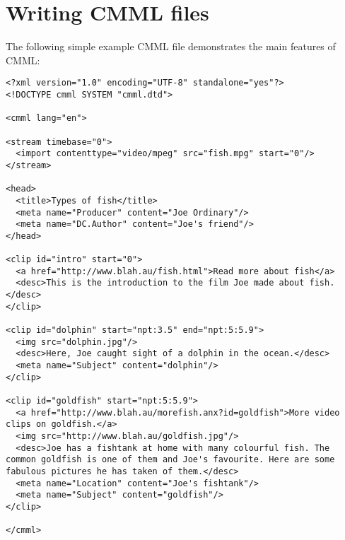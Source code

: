 \section{Writing CMML files}
\label{group__intro}
The following simple example CMML file demonstrates the main features of CMML:



\footnotesize\begin{verbatim}<?xml version="1.0" encoding="UTF-8" standalone="yes"?>
<!DOCTYPE cmml SYSTEM "cmml.dtd">

<cmml lang="en">

<stream timebase="0">
  <import contenttype="video/mpeg" src="fish.mpg" start="0"/>
</stream>

<head>
  <title>Types of fish</title>
  <meta name="Producer" content="Joe Ordinary"/>
  <meta name="DC.Author" content="Joe's friend"/>
</head>

<clip id="intro" start="0">
  <a href="http://www.blah.au/fish.html">Read more about fish</a>
  <desc>This is the introduction to the film Joe made about fish.</desc>
</clip>

<clip id="dolphin" start="npt:3.5" end="npt:5:5.9">
  <img src="dolphin.jpg"/>
  <desc>Here, Joe caught sight of a dolphin in the ocean.</desc>
  <meta name="Subject" content="dolphin"/>
</clip>

<clip id="goldfish" start="npt:5:5.9">
  <a href="http://www.blah.au/morefish.anx?id=goldfish">More video clips on goldfish.</a>
  <img src="http://www.blah.au/goldfish.jpg"/>
  <desc>Joe has a fishtank at home with many colourful fish. The common goldfish is one of them and Joe's favourite. Here are some fabulous pictures he has taken of them.</desc>
  <meta name="Location" content="Joe's fishtank"/>
  <meta name="Subject" content="goldfish"/>
</clip>

</cmml>
\end{verbatim}
\normalsize
